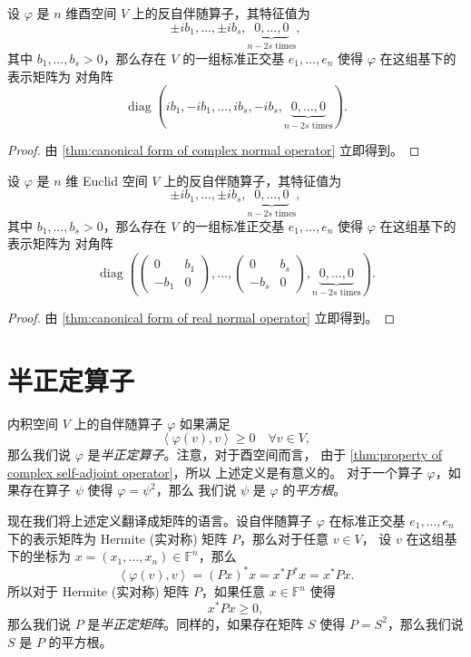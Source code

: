 \documentclass[fontset=none,zihao=-4]{Notes}
\DeclareMathOperator\diag{diag}
\newcommand{\inn}[1]{\left\langle#1\right\rangle}
\begin{document}
\begin{theorem}[反自伴随算子的酉相似]
  设 $\varphi$ 是 $n$ 维酉空间 $V$ 上的反自伴随算子，其特征值为
  \[
    \pm ib_1,\dots,\pm ib_s, \underbrace{0,\dots,0}_{\text{$n-2s$ times}},
  \]
  其中 $b_1,\dots,b_s>0$，那么存在 $V$
  的一组标准正交基 $e_1,\dots,e_n$ 使得 $\varphi$ 在这组基下的表示矩阵为
  对角阵
  \[
    \diag\left(ib_1,-ib_1,\dots,ib_s,-ib_s, \underbrace{0,\dots,0}_{\text{$n-2s$ times}}\right)  .
  \]
\end{theorem}
\begin{proof}
  由 \autoref{thm:canonical form of complex normal operator} 立即得到。
\end{proof}

\begin{theorem}[反自伴随算子的正交相似]
  设 $\varphi$ 是 $n$ 维 Euclid 空间 $V$ 上的反自伴随算子，其特征值为
  \[
    \pm ib_1,\dots,\pm ib_s, \underbrace{0,\dots,0}_{\text{$n-2s$ times}},
  \]
  其中 $b_1,\dots,b_s>0$，那么存在 $V$
  的一组标准正交基 $e_1,\dots,e_n$ 使得 $\varphi$ 在这组基下的表示矩阵为
  对角阵
  \[
    \diag\left(
      \begin{pmatrix}
        0 & b_1 \\
        -b_1 & 0
      \end{pmatrix},\dots,
      \begin{pmatrix}
        0 & b_s \\
        -b_s & 0
      \end{pmatrix},
      \underbrace{0,\dots,0}_{\text{$n-2s$ times}}
    \right)  .
  \]
\end{theorem}
\begin{proof}
  由 \autoref{thm:canonical form of real normal operator} 立即得到。
\end{proof}

\section{半正定算子}

内积空间 $V$ 上的自伴随算子 $\varphi$ 如果满足
\[
  \inn{\varphi(v),v}\geq 0\quad \forall v\in V,  
\]
那么我们说 $\varphi$ 是\emph{半正定算子}。注意，对于酉空间而言，
由于 \autoref{thm:property of complex self-adjoint operator}，所以
上述定义是有意义的。
对于一个算子 $\varphi$，如果存在算子 $\psi$ 使得 $\varphi=\psi^2$，那么
我们说 $\psi$ 是 $\varphi$ 的\emph{平方根}。

现在我们将上述定义翻译成矩阵的语言。设自伴随算子 $\varphi$ 在标准正交基
$e_1,\dots,e_n$ 下的表示矩阵为 Hermite (实对称) 矩阵 $P$，那么对于任意 $v\in V$，
设 $v$ 在这组基下的坐标为 $x=(x_1,\dots,x_n)\in\mathbb{F}^n$，那么
\[
  \inn{\varphi(v),v}=(Px)^*x=x^*P^*x=x^*Px.
\]
所以对于 Hermite (实对称) 矩阵 $P$，如果任意 $x\in\mathbb{F}^n$ 使得
\[
  x^*Px\geq 0,  
\]
那么我们说 $P$ 是\emph{半正定矩阵}。同样的，如果存在矩阵 $S$ 使得
$P=S^2$，那么我们说 $S$ 是 $P$ 的平方根。
\end{document}
